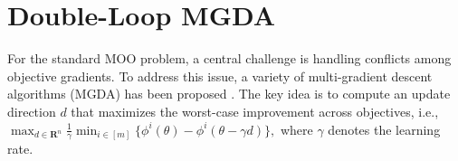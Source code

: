 \documentclass[twoside]{article} %
\def\eqref#1{equation~\ref{#1}}
\theoremstyle{plain}
\theoremstyle{definition}
\theoremstyle{remark}
\begin{document}
\section{Double-Loop MGDA}\label{sec: Double-loop algorithm}
For the standard MOO problem, a central challenge is handling conflicts among objective gradients. To address this issue, a variety of multi-gradient descent algorithms (MGDA) has been proposed \citep{MGDA1stwork,CAGrad,MOCO,MODO,SDMkaiyiJi,stochasticMGDA,qimgda}. The key idea is to compute an update direction \(d\) that maximizes the worst-case improvement across objectives, i.e.,
$
\max_{d\in\mathbf{R}^{{n}}}\frac{1}{\gamma}\min_{i\in[m]}\{\phi^i(\theta)-\phi^i(\theta-\gamma d)\},
$
where \(\gamma\) denotes the learning rate. 
\end{document}
